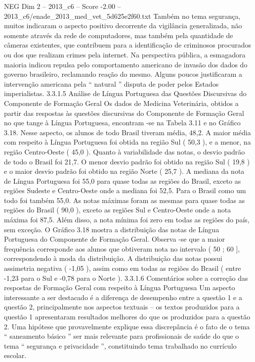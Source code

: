 \begin{textsample}{NEG Dim 2 – 2013\_c6 – Score -2.00 – 2013\_c6/enade\_2013\_med\_vet\_5d625e2f60.txt}
Também no tema segurança, muitos indicaram o aspecto positivo decorrente da vigilância generalizada, não somente através da rede de computadores, mas também pela quantidade de câmeras existentes, que contribuem para a identificação de criminosos procurados ou dos que realizam crimes pela internet.
Na perspectiva pública, a esmagadora maioria indicou repulsa pelo comportamento americano de invasão dos dados do governo brasileiro, reclamando reação do mesmo.
Alguns poucos justificaram a intervenção americana pela “ natural ” disputa de poder pelos Estados imperialistas. 3.3.1.5 Análise de Língua Portuguesa das Questões Discursivas do Componente de Formação Geral Os dados de Medicina Veterinária, obtidos a partir das respostas às questões discursivas do Componente de Formação Geral no que tange à Língua Portuguesa, encontram -se na Tabela 3.11 e no Gráfico 3.18.
Nesse aspecto, os alunos de todo Brasil tiveram média, 48,2.
A maior média com respeito à Língua Portuguesa foi obtida na região Sul ( 50,3 ), e a menor, na região Centro-Oeste ( 45,0 ).
Quanto à variabilidade das notas, o desvio padrão de todo o Brasil foi 21,7.
O menor desvio padrão foi obtido na região Sul ( 19,8 ) e o maior desvio padrão foi obtido na região Norte ( 25,7 ).
A mediana da nota de Língua Portuguesa foi 55,0 para quase todas as regiões do Brasil, exceto as regiões Sudeste e Centro-Oeste onde a mediana foi 52,5.
Para o Brasil como um todo foi também 55,0.
As notas máximas foram as mesmas para quase todas as regiões do Brasil ( 90,0 ), exceto as regiões Sul e Centro-Oeste onde a nota máxima foi 87,5.
Além disso, a nota mínima foi zero em todas as regiões do país, sem exceção.
O Gráfico 3.18 mostra a distribuição das notas de Língua Portuguesa do Componente de Formação Geral.
Observa -se que a maior frequência corresponde aos alunos que obtiveram nota no intervalo ( 50 ; 60 ], correspondendo à moda da distribuição.
A distribuição das notas possui assimetria negativa ( -1,05 ), assim como em todas as regiões do Brasil ( entre -1,23 para o Sul e -0,78 para o Norte ). 3.3.1.6 Comentários sobre a correção das respostas de Formação Geral com respeito à Língua Portuguesa Um aspecto interessante a ser destacado é a diferença de desempenho entre a questão 1 e a questão 2, principalmente nos aspectos textuais – os textos produzidos para a questão 1 apresentaram resultados melhores do que os produzidos para a questão 2.
Uma hipótese que provavelmente explique essa discrepância é o fato de o tema “ saneamento básico ” ser mais relevante para profissionais de saúde do que o tema “ segurança e privacidade ”, constituindo tema trabalhado no currículo escolar.

\end{textsample}
